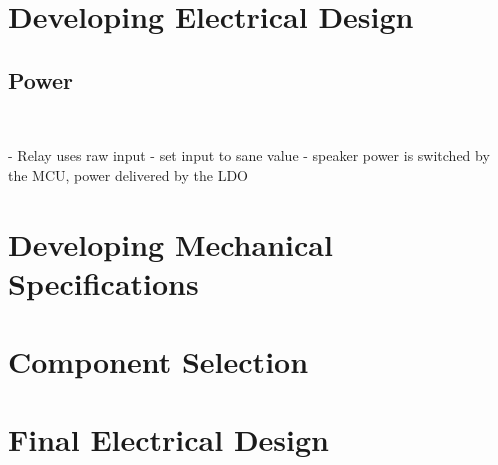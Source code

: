 \documentclass[12pt]{article}
\begin{document}
	
	
	\section{Developing Electrical Design}
	\subsection{Power}
  \

  - Relay uses raw input - set input to sane value
  - speaker power is switched by the MCU, power delivered by the LDO
	
	\section{Developing Mechanical Specifications}
	
	
	\section{Component Selection}
	
	\section{Final Electrical Design}
	
	
    \printglossaries
    
    \printbibliography[heading=bibintoc]
	
\end{document}
